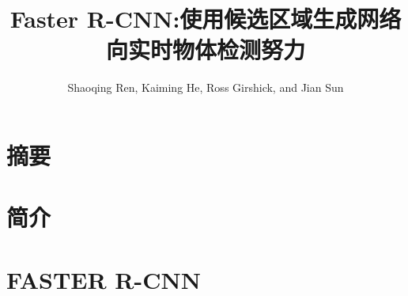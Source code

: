 \documentclass{ctexart}
\title{Faster R-CNN:使用候选区域生成网络向实时物体检测努力}
\author{Shaoqing Ren, Kaiming He, Ross Girshick, and Jian Sun}
\date{}
\begin{document}
\maketitle
\section{摘要}

\section{简介}

\section{FASTER R-CNN}

\printbibliography
\end{document}

